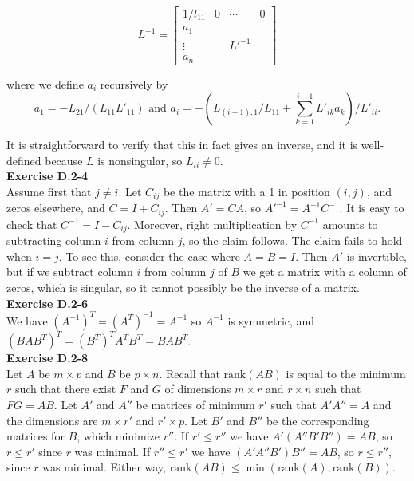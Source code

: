 \documentclass{article}
\newcommand{\rank}{\mbox{rank}}
\begin{document}
\[ L^{-1} = \left[ \begin{array}{c|ccc} 1/l_{11}& 0&\cdots&0 \\ \hline a_1 &&&\\ \vdots&&L'^{-1}& \\ a_n & && \end{array}\right] \]

where we define $a_i$ recursively by 
\[ a_1 = -L_{21}/(L_{11}L'_{11})  \mbox{ and } a_i = -\left(L_{(i+1),1}/L_{11} + \sum_{k=1}^{i-1} L'_{ik}a_k \right)/L'_{ii}.\]

It is straightforward to verify that this in fact gives an inverse, and it is well-defined because $L$ is nonsingular, so $L_{ii} \neq 0$.  \\

\noindent\textbf{Exercise D.2-4}\\

Assume first that $j\neq i$.  Let $C_{ij}$ be the matrix with a 1 in position $(i,j)$, and zeros elsewhere, and $C = I + C_{ij}$.  Then $A' = CA$, so $A'^{-1} = A^{-1}C^{-1}$.  It is easy to check that $C^{-1} = I-C_{ij}$.  Moreover, right multiplication by $C^{-1}$ amounts to subtracting column $i$ from column $j$, so the claim follows.  The claim fails to hold when $i=j$.  To see this, consider the case where $A = B = I$.  Then $A'$ is invertible, but if we subtract column $i$ from column $j$ of $B$ we get a matrix with a column of zeros, which is singular, so it cannot possibly be the inverse of a matrix.  \\

\noindent\textbf{Exercise D.2-6}\\

We have $(A^{-1})^T = (A^T)^{-1} = A^{-1}$ so $A^{-1}$ is symmetric, and $(BAB^T)^T = (B^T)^TA^TB^T = BAB^T$.   \\


\noindent\textbf{Exercise D.2-8}\\

Let $A$ be $m \times p$ and $B$ be $p \times n$.  Recall that $\rank(AB)$ is equal to the minimum $r$ such that there exist $F$ and $G$ of dimensions $m \times r$ and $r \times n$ such that $FG = AB$. Let $A'$ and $A''$ be matrices of minimum $r'$ such that $A'A'' = A$ and the dimensions are $m \times r'$ and $r' \times p$.  Let $B'$ and $B''$ be the corresponding matrices for $B$, which minimize $r''$.  If $r' \leq r''$ we have $A' (A''B'B'') = AB$, so $r \leq r'$ since $r$ was minimal.  If $r'' \leq r'$ we have $(A'A''B')B'' = AB$, so $r \leq r''$, since $r$ was minimal.  Either way, $\rank(AB) \leq \min(\rank(A), \rank(B))$.  
\end{document}
